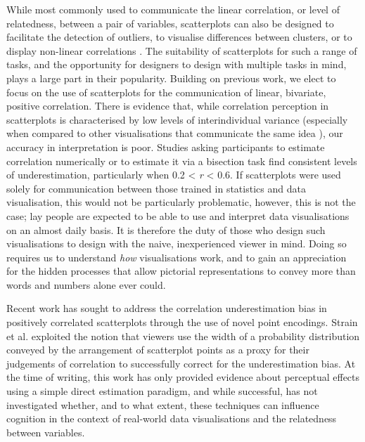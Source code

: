 \documentclass[sigconf]{acmart}
\begin{document}
While most commonly used to communicate the linear correlation, or level
of relatedness, between a pair of variables, scatterplots can also be
designed to facilitate the detection of outliers, to visualise
differences between clusters, or to display non-linear correlations
\citep{sarikaya_2018}. The suitability of scatterplots for such a range
of tasks, and the opportunity for designers to design with multiple
tasks in mind, plays a large part in their popularity. Building on
previous work, we elect to focus on the use of scatterplots for the
communication of linear, bivariate, positive correlation. There is
evidence that, while correlation perception in scatterplots is
characterised by low levels of interindividual variance (especially when
compared to other visualisations that communicate the same idea
\citep{harrison_2014, kay_2015}), our accuracy in interpretation is
poor. Studies asking participants to estimate correlation numerically
\citep{strahan_1978, bobko_1979, cleveland_1982, lane_1985, lauer_1989, collyer_1990, meyer_1992}
or to estimate it via a bisection task \citep{rensink_2017} find
consistent levels of underestimation, particularly when 0.2 \textless{}
\emph{r} \textless{} 0.6. If scatterplots were used solely for
communication between those trained in statistics and data
visualisation, this would not be particularly problematic, however, this
is not the case; lay people are expected to be able to use and interpret
data visualisations on an almost daily basis. It is therefore the duty
of those who design such visualisations to design with the naive,
inexperienced viewer in mind. Doing so requires us to understand
\emph{how} visualisations work, and to gain an appreciation for the
hidden processes that allow pictorial representations to convey more
than words and numbers alone ever could.

Recent work has sought to address the correlation underestimation bias
in positively correlated scatterplots through the use of novel point
encodings. Strain et al. \citep{strain_2023, strain_2023b, strain_2024}
exploited the notion that viewers use the width of a probability
distribution conveyed by the arrangement of scatterplot points as a
proxy for their judgements of correlation to successfully correct for
the underestimation bias. At the time of writing, this work has only
provided evidence about perceptual effects using a simple direct
estimation paradigm, and while successful, has not investigated whether,
and to what extent, these techniques can influence cognition in the
context of real-world data visualisations and the relatedness between
variables.
\end{document}
